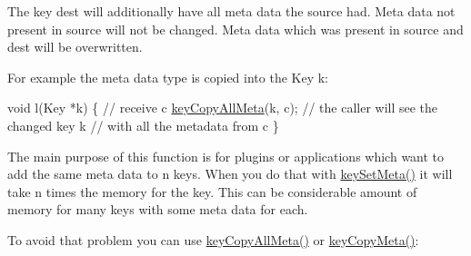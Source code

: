 The key dest will additionally have all meta data the source had. Meta data not present in source will not be changed. Meta data which was present in source and dest will be overwritten.

For example the meta data type is copied into the Key k\-:


\begin{DoxyCodeInclude}
\textcolor{keywordtype}{void} l(Key *k)
\{
        \textcolor{comment}{// receive c}
        \hyperlink{group__keymeta_ga8e63720a65610a29597494d0671f9401}{keyCopyAllMeta}(k, c);
        \textcolor{comment}{// the caller will see the changed key k}
        \textcolor{comment}{// with all the metadata from c}
\}
\end{DoxyCodeInclude}
 The main purpose of this function is for plugins or applications which want to add the same meta data to n keys. When you do that with \hyperlink{group__keymeta_gae1f15546b234ffb6007d8a31178652b9}{key\-Set\-Meta()} it will take n times the memory for the key. This can be considerable amount of memory for many keys with some meta data for each.

To avoid that problem you can use \hyperlink{group__keymeta_ga8e63720a65610a29597494d0671f9401}{key\-Copy\-All\-Meta()} or \hyperlink{group__keymeta_ga9a22b992478e613c8788bd460b4a1f0c}{key\-Copy\-Meta()}\-:


